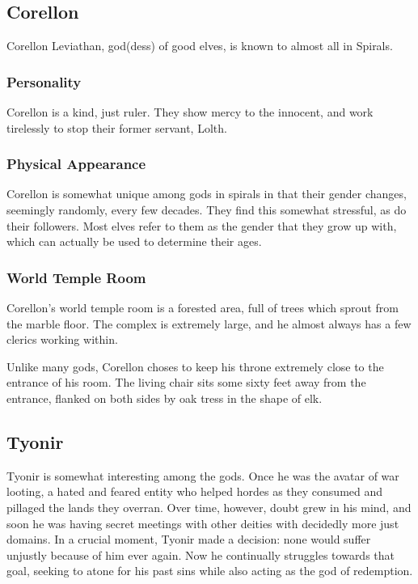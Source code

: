 \subsection*{Corellon}
\begin{goddesc}
\end{goddesc}
Corellon Leviathan, god(dess) of good elves, is known to almost all in Spirals.

\subsubsection*{Personality}
Corellon is a kind, just ruler.
They show mercy to the innocent, and work tirelessly to stop their former servant, Lolth.

\subsubsection*{Physical Appearance}
 Corellon is somewhat unique among gods in spirals in that their gender changes, seemingly randomly, every few decades.
 They find this somewhat stressful, as do their followers.
 Most elves refer to them as the gender that they grow up with, which can actually be used to determine their ages.
 
 \subsubsection*{World Temple Room}
 Corellon's world temple room is a forested area, full of trees which sprout from the marble floor.
 The complex is extremely large, and he almost always has a few clerics working within.
 
 Unlike many gods, Corellon choses to keep his throne extremely close to the entrance of his room.
The living chair sits some sixty feet away from the entrance, flanked on both sides by oak tress in the shape of elk.

\subsection{Tyonir}
\begin{goddesc}
\end{goddesc}
Tyonir is somewhat interesting among the gods.
Once he was the avatar of war looting, a hated and feared entity who helped hordes as they consumed and pillaged the lands they overran.
Over time, however, doubt grew in his mind, and soon he was having secret meetings with other deities with decidedly more just domains. 
In a crucial moment, Tyonir made a decision: none would suffer unjustly because of him ever again.
Now he continually struggles towards that goal, seeking to atone for his past sins while also acting as the god of redemption.

